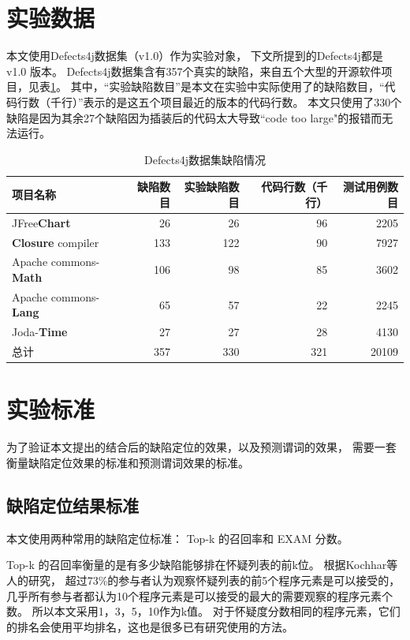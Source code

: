 \section{实验数据}

本文使用Defects4j数据集\parencite{Just2014Defects4J}（v1.0）作为实验对象，
下文所提到的Defects4j都是 v1.0 版本。
Defects4j数据集含有357个真实的缺陷，来自五个大型的开源软件项目，见表\ref{defects4j_details}。
其中，“实验缺陷数目”是本文在实验中实际使用了的缺陷数目，“代码行数（千行）”表示的是这五个项目最近的版本的代码行数。
本文只使用了330个缺陷是因为其余27个缺陷因为插装后的代码太大导致“code too large"的报错而无法运行。

\begin{table}
\centering
\caption{Defects4j数据集缺陷情况}
\begin{tabular}{|l|r|r|r|r|}
\hline
项目名称 & 缺陷数目 & 实验缺陷数目 & 代码行数（千行） & 测试用例数目 \\
\hline
JFree\textbf{Chart} & 26 & 26 & 96 & 2205 \\
\hline
\textbf{Closure} compiler & 133 & 122 & 90 & 7927 \\
\hline
Apache commons-\textbf{Math} & 106 & 98 & 85 & 3602 \\
\hline
Apache commons-\textbf{Lang} & 65 & 57 & 22 & 2245 \\
\hline
Joda-\textbf{Time} & 27 & 27 & 28 & 4130 \\
\hline
总计 & 357 & 330 & 321 & 20109 \\
\hline
\end{tabular}
\label{defects4j_details}
\end{table}

\section{实验标准}

为了验证本文提出的结合后的缺陷定位的效果，以及预测谓词的效果，
需要一套衡量缺陷定位效果的标准和预测谓词效果的标准。

\subsection{缺陷定位结果标准}

本文使用两种常用的缺陷定位标准： Top-k 的召回率和 EXAM 分数。

Top-k 的召回率衡量的是有多少缺陷能够排在怀疑列表的前k位。
根据Kochhar等人的研究\parencite{Kochhar2016Practitioners}，
超过73\%的参与者认为观察怀疑列表的前5个程序元素是可以接受的，
几乎所有参与者都认为10个程序元素是可以接受的最大的需要观察的程序元素个数。
所以本文采用1，3，5，10作为k值。
对于怀疑度分数相同的程序元素，它们的排名会使用平均排名，这也是很多已有研究使用的方法\parencite{Pearson2017Evaluating,Xuan2014Learning,Steimann2013Threats,Wong2016A}。

